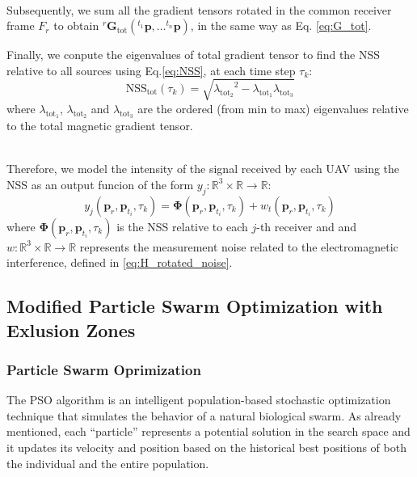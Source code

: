 \noindent
\\
Subsequently, we sum all the gradient tensors rotated in the common receiver frame $F_{r}$
to obtain ${}^{r} \mathbf{G}_{\text{tot}} ({}^{t_1} \mathbf{p}, \dots {}^{t_n} \mathbf{p})$, in the same way as Eq. \ref{eq:G_tot}.

Finally, we conpute the eigenvalues of total gradient 
tensor to find the NSS relative to all sources using Eq.\ref{eq:NSS},
 at each time step \( \tau_k \):
\begin{equation}
    \text{NSS}_\text{tot}(\tau_k) = \sqrt{{\lambda_{\text{tot}_2}}^2 - \lambda_{\text{tot}_1} \lambda_{\text{tot}_3}}
    \label{eq:NSS_multi_final}
\end{equation}
where $\lambda_{\text{tot}_1}$, $\lambda_{\text{tot}_2}$ and $\lambda_{\text{tot}_3}$
are the ordered (from min to max) eigenvalues relative to the total magnetic gradient tensor.

\noindent
\\
Therefore, we model the intensity of the signal received by each UAV using the NSS
as an output funcion of the form \( y_j : \mathbb{R}^3 
\times \mathbb{R} \rightarrow \mathbb{R} \):
\begin{equation}
y_j(\mathbf{p}_{r}, \mathbf{p}_{t_i}, \tau_k) = \mathbf{\Phi}(\mathbf{p}_{r}, \mathbf{p}_{t_i}, \tau_k) + 
w_t(\mathbf{p}_{r}, \mathbf{p}_{t_i}, \tau_k)
\label{eq:received_signal}
\end{equation}
where $\mathbf{\Phi}(\mathbf{p}_{r}, \mathbf{p}_{t_i}, \tau_k)$ is the NSS
relative to each $j$-th receiver and 
and \( w : \mathbb{R}^3 \times \mathbb{R} \rightarrow \mathbb{R} \) 
represents the measurement noise related to the electromagnetic interference,
defined in \ref{eq:H_rotated_noise}.

\subsection{Modified Particle Swarm Optimization with Exlusion Zones}

\subsubsection{Particle Swarm Oprimization}
The PSO algorithm is an intelligent population-based stochastic optimization technique 
that simulates the behavior of a natural biological swarm. 
As already mentioned, each “particle” represents a potential solution in the search space
and it updates its velocity and position based on the historical best positions 
of both the individual and the entire population.
 
